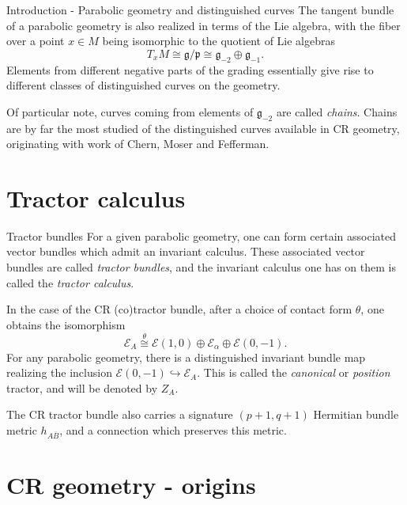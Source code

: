 \documentclass[handout]{beamer}
\begin{document}
\begin{frame}{Introduction - Parabolic geometry and distinguished curves}
  The tangent bundle of a parabolic geometry is also realized in terms of
  the Lie algebra, with the fiber over a point $x \in M$ being isomorphic to the quotient
  of Lie algebras 
  \[
    T_x M \cong \mathfrak{g} / \mathfrak{p} \cong
    \mathfrak{g}_{-2} \oplus \mathfrak{g}_{-1}.
  \]
  Elements from different negative parts of the grading essentially give rise to
  different classes of distinguished curves on the geometry.

  Of particular note, curves coming from elements of $\mathfrak{g}_{-2}$
  are called \emph{chains}.
  Chains are by far the most studied of the distinguished curves available in
  CR geometry, originating with work of Chern, Moser and Fefferman. 
\end{frame}

\section{Tractor calculus}

\begin{frame}{Tractor bundles}
  For a given parabolic geometry, one can form certain associated vector bundles
  which admit an invariant calculus.
  \vfill
  These associated vector bundles are called \emph{tractor bundles}, and the
  invariant calculus one has on them is called the \emph{tractor calculus}.

  \vfill

  In the case of the CR (co)tractor bundle, after a choice of contact form
  $\theta$, one obtains the isomorphism
  \[
    \mathcal{E}_A \overset{\theta}{\cong} \mathcal{E} (1,0) \oplus \mathcal{E}_\alpha
    \oplus \mathcal{E} (0,-1).
  \]
  \vfill
  For any parabolic geometry, there is a distinguished invariant bundle map
  realizing the inclusion $\mathcal{E}(0,-1) \hookrightarrow \mathcal{E}_A$.
  This is called the \emph{canonical} or \emph{position} tractor, and will be
  denoted by $Z_A$.

  \vfill
  The CR tractor bundle also carries a signature $(p+1,q+1)$ Hermitian bundle
  metric $h_{A \overline{B}}$, and a connection which preserves this metric.

\end{frame}

\section{CR geometry - origins}
\end{document}
